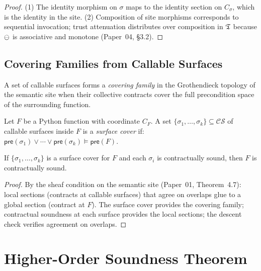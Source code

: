 \documentclass[11pt]{article}
\newcommand{\CS}{\mathcal{CS}}                 %
\newcommand{\surf}{\sigma}                     %
\newcommand{\Pre}{\mathsf{pre}}                %
\begin{document}
\begin{proof}
(1) The identity morphism on $\surf$ maps to the identity section on
$C_\surf$, which is the identity in the site.
(2) Composition of site morphisms corresponds to sequential
invocation; trust attenuation distributes over composition in $\mathfrak{T}$
because $\ominus$ is associative and monotone
(Paper~04, \S3.2).
\end{proof}

\subsection{Covering Families from Callable Surfaces}

A set of callable surfaces forms a \emph{covering family} in the
Grothendieck topology of the semantic site when their collective
contracts cover the full precondition space of the surrounding
function.

\begin{definition}\label{def:surfcover}
Let $F$ be a Python function with coordinate $C_F$.  A set
$\{\surf_1, \dots, \surf_k\} \subseteq \CS$ of callable surfaces
inside $F$ is a \emph{surface cover} if:
$\Pre(\surf_1) \vee \cdots \vee \Pre(\surf_k) \models \Pre(F)$.
\end{definition}

\begin{proposition}\label{prop:covdescent}
If $\{\surf_1,\dots,\surf_k\}$ is a surface cover for $F$ and each
$\surf_i$ is contractually sound, then $F$ is contractually sound.
\end{proposition}

\begin{proof}
By the sheaf condition on the semantic site (Paper~01, Theorem~4.7):
local sections (contracts at callable surfaces) that agree on
overlaps glue to a global section (contract at $F$).  The surface
cover provides the covering family; contractual soundness at each
surface provides the local sections; the descent check verifies
agreement on overlaps.
\end{proof}

\section{Higher-Order Soundness Theorem}\label{sec:theorem}
\end{document}

